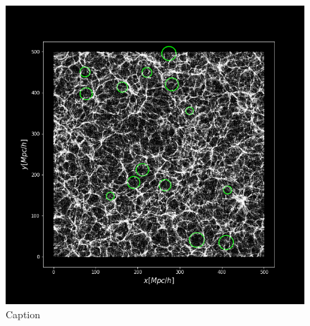 \begin{figure}
    \centering
    \includegraphics[width=12cm]{Figures/voids_r2.png}
    \caption{Caption}
    \label{VoidsIdentificados}
    
\end{figure}{}

